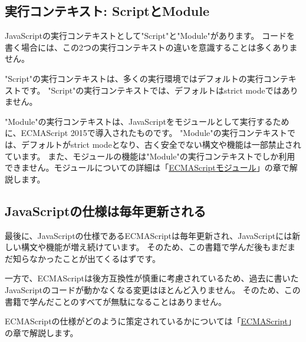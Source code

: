 \hypertarget{script-module}{%
\subsection{実行コンテキスト: ScriptとModule}\label{script-module}}

JavaScriptの実行コンテキストとして"Script"と"Module"があります。
コードを書く場合には、この2つの実行コンテキストの違いを意識することは多くありません。

"Script"の実行コンテキストは、多くの実行環境ではデフォルトの実行コンテキストです。
"Script"の実行コンテキストでは、デフォルトはstrict modeではありません。

"Module"の実行コンテキストは、JavaScriptをモジュールとして実行するために、ECMAScript 2015で導入されたものです。
"Module"の実行コンテキストでは、デフォルトがstrict modeとなり、古く安全でない構文や機能は一部禁止されています。
また、モジュールの機能は"Module"の実行コンテキストでしか利用できません。モジュールについての詳細は「\hyperlink{module}{ECMAScriptモジュール}」の章で解説します。

\hypertarget{ecmascript-updates}{%
\subsection{JavaScriptの仕様は毎年更新される}\label{ecmascript-updates}}

最後に、JavaScriptの仕様であるECMAScriptは毎年更新され、JavaScriptには新しい構文や機能が増え続けています。
そのため、この書籍で学んだ後もまだまだ知らなかったことが出てくるはずです。

一方で、ECMAScriptは後方互換性が慎重に考慮されているため、過去に書いたJavaScriptのコードが動かなくなる変更はほとんど入りません。
そのため、この書籍で学んだことのすべてが無駄になることはありません。

ECMAScriptの仕様がどのように策定されているかについては「\hyperlink{ecmascript}{ECMAScript}」の章で解説します。
